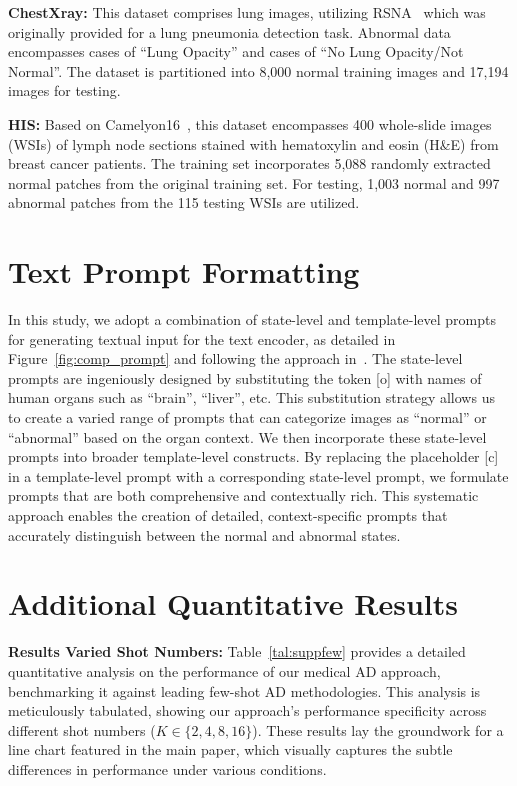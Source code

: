 \noindent\textbf{ChestXray:} This dataset comprises lung images, utilizing RSNA~\cite{wang2017chestx} which was originally provided for a lung pneumonia detection task. Abnormal data encompasses cases of ``Lung Opacity'' and cases of ``No Lung Opacity/Not Normal''. The dataset is partitioned into 8,000 normal training images and 17,194 images for testing.

\noindent\textbf{HIS:} Based on Camelyon16~\cite{bejnordi2017diagnostic}, this dataset encompasses 400 whole-slide images (WSIs) of lymph node sections stained with hematoxylin and eosin (H\&E) from breast cancer patients. The training set incorporates 5,088 randomly extracted normal patches from the original training set. For testing, 1,003 normal and 997 abnormal patches from the 115 testing WSIs are utilized.

\section{Text Prompt Formatting}\label{sec:ap_text}
In this study, we adopt a combination of state-level and template-level prompts for generating textual input for the text encoder, as detailed in Figure~\ref{fig:comp_prompt} and following the approach in~\cite{winclip}. The state-level prompts are ingeniously designed by substituting the token [o] with names of human organs such as ``brain'', ``liver'', etc. This substitution strategy allows us to create a varied range of prompts that can categorize images as ``normal'' or ``abnormal'' based on the organ context. We then incorporate these state-level prompts into broader template-level constructs. By replacing the placeholder [c] in a template-level prompt with a corresponding state-level prompt, we formulate prompts that are both comprehensive and contextually rich. This systematic approach enables the creation of detailed, context-specific prompts that accurately distinguish between the normal and abnormal states.

\section{Additional Quantitative Results}\label{sec:ap_results}
\textbf{Results Varied Shot Numbers:} Table~\ref{tal:suppfew} provides a detailed quantitative analysis on the performance of our medical AD approach, benchmarking it against leading few-shot AD methodologies. This analysis is meticulously tabulated, showing our approach's performance specificity across different shot numbers ($K\in\{2,4,8,16\}$). These results lay the groundwork for a line chart featured in the main paper, which visually captures the subtle differences in performance under various conditions.

